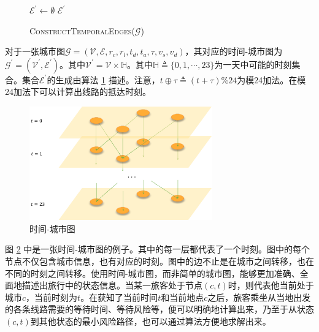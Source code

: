 \begin{figure}
\begin{minipage}{0.57\textwidth}
\begin{algorithm}[H]
\caption{\textsc{ConstructTemporalEdges}($\mathcal G$)}
\label{algo:construct-temporal-edges}
$\mathcal E^\prime \gets \emptyset$\;
\Return $\mathcal E^\prime$\;
\end{algorithm}
\end{minipage}
\end{figure}

\begin{definition}[时间-城市图]
  对于一张城市图$\mathcal G = (\mathcal V, \mathcal E, r_c, r_l, t_d, t_a, \tau, v_s, v_d)$，其对应的时间-城市图为$\mathcal G^\prime = (\mathcal V^\prime, \mathcal E^\prime)$。其中$\mathcal V^\prime =  \mathcal V \times \mathds H$。其中$\mathds H \triangleq \{ 0, 1, \cdots, 23 \}$为一天中可能的时刻集合。集合$\mathcal E^\prime$的生成由算法 \ref{algo:construct-temporal-edges} 描述。注意，$t \oplus \tau \triangleq (t + \tau) \% 24$为模24加法。在模24加法下可以计算出线路的抵达时刻。
\end{definition}

\begin{figure}[t]
  \centering
  \includegraphics[width=0.7\textwidth]{figures/time_map}
  \caption{时间-城市图}
  \label{fig:time-map}
\end{figure}

图 \ref{fig:time-map} 中是一张时间-城市图的例子。其中的每一层都代表了一个时刻。图中的每个节点不仅包含城市信息，也有对应的时刻。图中的边不止是在城市之间转移，也在不同的时刻之间转移。使用时间-城市图，而非简单的城市图，能够更加准确、全面地描述出旅行中的状态信息。当某一旅客处于节点$(c, t)$时，则代表他当前处于城市$c$，当前时刻为$t$。在获知了当前时间$t$和当前地点$c$之后，旅客乘坐从当地出发的各条线路需要的等待时间、等待风险等，便可以明确地计算出来，乃至于从状态$(c, t)$到其他状态的最小风险路径，也可以通过算法方便地求解出来。

